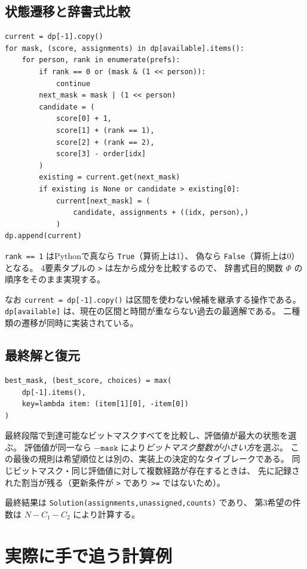 \documentclass[11pt,a4paper]{ltjsarticle}
\theoremstyle{definition}
\theoremstyle{remark}
\newcommand{\code}[1]{\texttt{#1}}
\begin{document}
\subsection{状態遷移と辞書式比較}
\begin{Verbatim}[fontsize=\small,frame=single]
current = dp[-1].copy()
for mask, (score, assignments) in dp[available].items():
    for person, rank in enumerate(prefs):
        if rank == 0 or (mask & (1 << person)):
            continue
        next_mask = mask | (1 << person)
        candidate = (
            score[0] + 1,
            score[1] + (rank == 1),
            score[2] + (rank == 2),
            score[3] - order[idx]
        )
        existing = current.get(next_mask)
        if existing is None or candidate > existing[0]:
            current[next_mask] = (
                candidate, assignments + ((idx, person),)
            )
dp.append(current)
\end{Verbatim}

\code{rank == 1} はPythonで真なら \code{True}（算術上は1）、
偽なら \code{False}（算術上は0）となる。
4要素タプルの \code{>} は左から成分を比較するので、
辞書式目的関数 $\Phi$ の順序をそのまま実現する。

なお \code{current = dp[-1].copy()} は区間を使わない候補を継承する操作である。
\code{dp[available]} は、現在の区間と時間が重ならない過去の最適解である。
二種類の遷移が同時に実装されている。

\subsection{最終解と復元}
\begin{Verbatim}[fontsize=\small,frame=single]
best_mask, (best_score, choices) = max(
    dp[-1].items(),
    key=lambda item: (item[1][0], -item[0])
)
\end{Verbatim}

最終段階で到達可能なビットマスクすべてを比較し、評価値が最大の状態を選ぶ。
評価値が同一なら $-\code{mask}$ により\emph{ビットマスク整数が小さい方}を選ぶ。
この最後の規則は希望順位とは別の、実装上の決定的なタイブレークである。
同じビットマスク・同じ評価値に対して複数経路が存在するときは、
先に記録された割当が残る（更新条件が \code{>} であり \code{>=} ではないため）。

最終結果は \code{Solution(assignments,unassigned,counts)} であり、
第3希望の件数は $N-C_1-C_2$ により計算する。

\section{実際に手で追う計算例}
\end{document}
